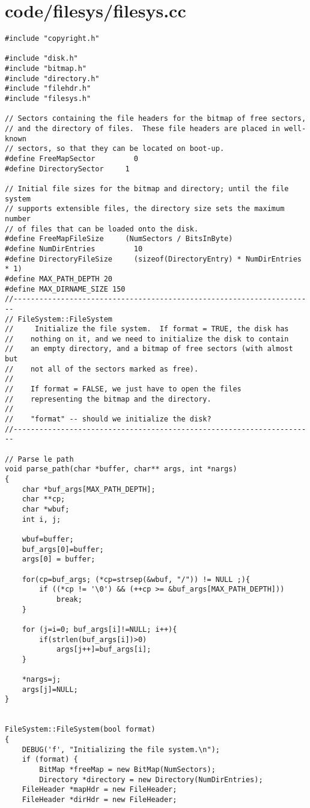 \documentclass[a4paper,10pt]{article}
\begin{document}
\section{code/filesys/filesys.cc}
\begin{lstlisting}
#include "copyright.h"

#include "disk.h"
#include "bitmap.h"
#include "directory.h"
#include "filehdr.h"
#include "filesys.h"

// Sectors containing the file headers for the bitmap of free sectors,
// and the directory of files.  These file headers are placed in well-known
// sectors, so that they can be located on boot-up.
#define FreeMapSector         0
#define DirectorySector     1

// Initial file sizes for the bitmap and directory; until the file system
// supports extensible files, the directory size sets the maximum number
// of files that can be loaded onto the disk.
#define FreeMapFileSize     (NumSectors / BitsInByte)
#define NumDirEntries         10
#define DirectoryFileSize     (sizeof(DirectoryEntry) * NumDirEntries * 1)
#define MAX_PATH_DEPTH 20
#define MAX_DIRNAME_SIZE 150
//----------------------------------------------------------------------
// FileSystem::FileSystem
//     Initialize the file system.  If format = TRUE, the disk has
//    nothing on it, and we need to initialize the disk to contain
//    an empty directory, and a bitmap of free sectors (with almost but
//    not all of the sectors marked as free).
//
//    If format = FALSE, we just have to open the files
//    representing the bitmap and the directory.
//
//    "format" -- should we initialize the disk?
//----------------------------------------------------------------------

// Parse le path
void parse_path(char *buffer, char** args, int *nargs)
{
    char *buf_args[MAX_PATH_DEPTH];
    char **cp;
    char *wbuf;
    int i, j;

    wbuf=buffer;
    buf_args[0]=buffer;
    args[0] = buffer;

    for(cp=buf_args; (*cp=strsep(&wbuf, "/")) != NULL ;){
        if ((*cp != '\0') && (++cp >= &buf_args[MAX_PATH_DEPTH]))
            break;
    }

    for (j=i=0; buf_args[i]!=NULL; i++){
        if(strlen(buf_args[i])>0)
            args[j++]=buf_args[i];
    }

    *nargs=j;
    args[j]=NULL;
}


FileSystem::FileSystem(bool format)
{
    DEBUG('f', "Initializing the file system.\n");
    if (format) {
        BitMap *freeMap = new BitMap(NumSectors);
        Directory *directory = new Directory(NumDirEntries);
    FileHeader *mapHdr = new FileHeader;
    FileHeader *dirHdr = new FileHeader;


\end{lstlisting}
\end{document}
